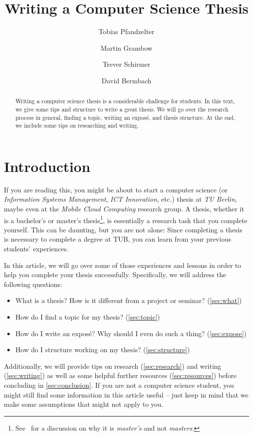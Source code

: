 \documentclass[a4paper]{article}
\title{Writing a Computer Science Thesis}
\author{Tobias Pfandzelter}
\author{Martin Grambow}
\author{Trever Schirmer}
\author{David Bermbach}
\affil{Mobile Cloud Computing Research Group\\TU Berlin \& Einstein Center Digital Future\\Berlin, Germany\\\texttt{\{tp,mg,ts,db\}@mcc.tu-berlin.de}}
\begin{document}
\maketitle
\begin{abstract}
    Writing a computer science thesis is a considerable challenge for students.
    In this text, we give some tips and structure to write a great thesis.
    We will go over the research process in general, finding a topic, writing an expos\'e, and thesis structure.
    At the end, we include some tips on researching and writing.
\end{abstract}

\section{Introduction}
\label{sec:introduction}

If you are reading this, you might be about to start a computer science (or \emph{Information Systems Management}, \emph{ICT Innovation}, etc.) thesis at \emph{TU Berlin}, maybe even at the \emph{Mobile Cloud Computing} research group.
A thesis, whether it is a bachelor's or master's thesis\footnote{See~\cite{masters-apostrophe-as} for a discussion on why it is \emph{master's} and not \emph{masters}.}, is essentially a research task that you complete yourself.
This can be daunting, but you are not alone: Since completing a thesis is necessary to complete a degree at TUB, you can learn from your previous students' experiences.

In this article, we will go over some of those experiences and lessons in order to help you complete your thesis successfully.
Specifically, we will address the following questions:

\begin{itemize}
    \item What is a thesis? How is it different from a project or seminar? (\cref{sec:what})
    \item How do I find a topic for my thesis? (\cref{sec:topic})
    \item How do I write an expos\'e? Why should I even do such a thing? (\cref{sec:expose})
    \item How do I structure working on my thesis? (\cref{sec:structure})
\end{itemize}

Additionally, we will provide tips on research (\cref{sec:research}) and writing (\cref{sec:writing}) as well as some helpful further resources (\cref{sec:resources}) before concluding in \cref{sec:conclusion}.
If you are not a computer science student, you might still find some information in this article useful -- just keep in mind that we make some assumptions that might not apply to you.
\end{document}
